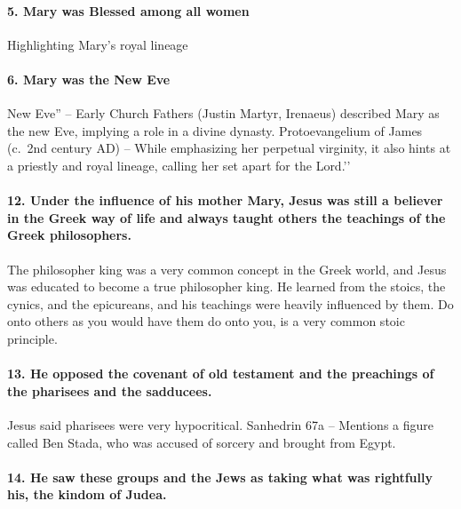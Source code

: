 \paragraph{5.
Mary was Blessed among all women}\label{par:mary-was-blessed-among-all-women}
Highlighting Mary’s royal lineage
\paragraph{6.
Mary was the New Eve}\label{par:mary-was-the-new-eve}
New Eve'' -- Early Church Fathers (Justin Martyr, Irenaeus) described Mary as the new Eve, implying a role in a divine dynasty. Protoevangelium of James (c.~2nd century AD) -- While emphasizing her perpetual virginity, it also hints at a priestly and royal lineage, calling her set apart for the Lord.’’

\paragraph{12.
Under the influence of his mother Mary, Jesus was still a believer in the Greek way of life and always taught others the teachings of the Greek philosophers.}\label{par:under-the-influence-of-his-mother-mary-jesus-was-still-a-believer-in-the-greek-way-of-life-and-always-taught-others-the-teachings-of-the-greek-philosophers.}

The philosopher king was a very common concept in the Greek world, and Jesus was educated to become a true philosopher king.
He learned from the stoics, the cynics, and the epicureans, and his teachings were heavily influenced by them.
Do onto others as you would have them do onto you, is a very common stoic principle.

\paragraph{13.
He opposed the covenant of old testament and the preachings of the pharisees and the sadducees.}\label{par:he-opposed-the-covenant-of-old-testament-and-the-preachings-of-the-pharisees-and-the-sadducees.}

Jesus said pharisees were very hypocritical.
Sanhedrin 67a -- Mentions a figure called Ben Stada, who was accused of sorcery and brought from Egypt.

\paragraph{14.
He saw these groups and the Jews as taking what was rightfully his, the kindom of Judea.}\label{par:he-saw-these-groups-and-the-jews-as-taking-what-was-rightfully-his-the-kindom-of-judea.}

